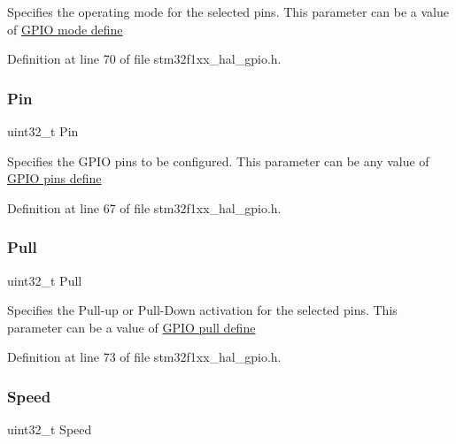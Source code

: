 Specifies the operating mode for the selected pins. This parameter can be a value of \hyperlink{group___g_p_i_o__mode__define}{G\+P\+IO mode define} 

Definition at line 70 of file stm32f1xx\+\_\+hal\+\_\+gpio.\+h.

\mbox{\label{struct_g_p_i_o___init_type_def_a871d0ab74071724e96b7cc9ae2a7532b}} 
\subsubsection{\texorpdfstring{Pin}{Pin}}
{\footnotesize\ttfamily uint32\+\_\+t Pin}

Specifies the G\+P\+IO pins to be configured. This parameter can be any value of \hyperlink{group___g_p_i_o__pins__define}{G\+P\+IO pins define} 

Definition at line 67 of file stm32f1xx\+\_\+hal\+\_\+gpio.\+h.

\mbox{\label{struct_g_p_i_o___init_type_def_a6cdde08eb507b710f8179a4326548e26}} 
\subsubsection{\texorpdfstring{Pull}{Pull}}
{\footnotesize\ttfamily uint32\+\_\+t Pull}

Specifies the Pull-\/up or Pull-\/\+Down activation for the selected pins. This parameter can be a value of \hyperlink{group___g_p_i_o__pull__define}{G\+P\+IO pull define} 

Definition at line 73 of file stm32f1xx\+\_\+hal\+\_\+gpio.\+h.

\mbox{\label{struct_g_p_i_o___init_type_def_ad04b2041f59d32492ec36a891418f3fd}} 
\subsubsection{\texorpdfstring{Speed}{Speed}}
{\footnotesize\ttfamily uint32\+\_\+t Speed}

